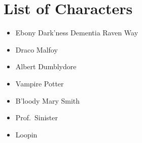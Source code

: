 \cleardoublepage\chapter{List of Characters}


\begin{itemize}
	\item Ebony Dark'ness Dementia Raven Way
	\item Draco Malfoy
	\item Albert Dumblydore
	\item Vampire Potter
	\item B'loody Mary Smith
	\item Prof.~Sinister
	\item Loopin
\end{itemize}
